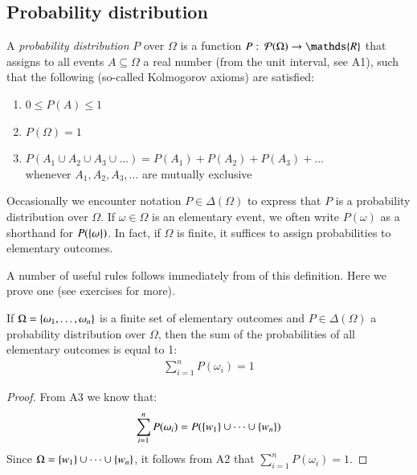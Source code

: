 \documentclass[nobib,nofonts]{tufte-handout}
\renewcommand{\markdef}[1]{\emph{#1}}
\begin{document}
\subsection{Probability distribution}

A \markdef{probability distribution} $P$ over $\Omega$ is a function
$P \mycolon \pow{\Omega} \rightarrow \mathds{R}$ that assigns to all events
$A \subseteq \Omega$ a real number (from the unit interval, see A1), such that the following
(so-called Kolmogorov axioms) are satisfied:
\begin{enumerate}[{A}1.]
\item $0 \le P(A) \le 1$
\item $P(\Omega) = 1$
\item $P(A_1 \cup A_2 \cup A_3 \cup \dots) = P(A_1) + P(A_2) + P(A_3) + \dots $ \\
  whenever $A_1, A_2, A_3, \dots$ are mutually exclusive
\end{enumerate}
Occasionally we encounter notation $P \in \Delta(\Omega)$ to express that $P$ is a probability
distribution over $\Omega$. If $\omega \in \Omega$ is an elementary event,
we often write $P(\omega)$ as a shorthand for $P(\left\{\omega\right\})$. In fact, if $\Omega$ is
finite, it suffices to assign probabilities to elementary outcomes.

A number of useful rules follows immediately from of this definition.
Here we prove one (see exercises for more).

\begin{claim}
  \label{theorem:sum-of-elementary-outcomes}
  If $\Omega = \left\{\omega_{1}, \dots, \omega_{n}\right\}$ is a finite set of elementary outcomes and $P \in \Delta(\Omega)$ a probability distribution over $\Omega$, then the sum of the probabilities of all elementary outcomes is equal to 1:
  \begin{align*}
    \sum_{i = 1}^{n} P(\omega_{i}) = 1
  \end{align*}
\end{claim}
\begin{proof}
  From A3 we know that:
  \begin{align*}
  \sum_{i = 1}^{n} P(\omega_{i}) = P(\left\{w_{1}\right\} \cup \dots \cup \left\{w_{n}\right\})
  \end{align*}
  Since $\Omega = \left\{w_{1}\right\} \cup \dots \cup \left\{w_{n}\right\}$, it follows from A2 that $\sum_{i = 1}^{n} P(\omega_{i}) = 1$.
\end{proof}
\end{document}
